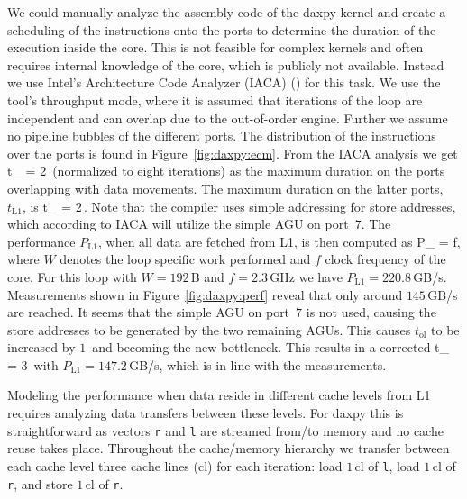 We could manually analyze the assembly code of the daxpy kernel and create a
scheduling of the instructions onto the ports to determine the duration of the
execution inside the core.
This is not feasible for complex kernels and often requires internal knowledge
of the core, which is publicly not available.
Instead we use Intel's Architecture Code Analyzer (IACA) (\cite{intel-iaca})
for this task. 
We use the tool's throughput mode, where it is assumed that iterations of the
loop are independent and can overlap due to the out-of-order engine.
Further we assume no pipeline bubbles of the different ports. 
The distribution of the instructions over the ports is found in
Figure~\ref{fig:daxpy:ecm}.
%
From the IACA analysis we get 
\be
  t_ = 2\,\cyw
\ee
%
(normalized to eight iterations) as the maximum duration on the ports overlapping with data
movements.
The maximum duration on the latter ports, $t_\text{L1}$, is
\be
  t_ = 2\,\cyw.
\ee
%
Note that the compiler uses simple addressing for store addresses, which
according to IACA will utilize the simple AGU on port~$7$.
%
%
The performance $P_\text{L1}$, when all data are fetched from L1, is then
computed as 
%
\be
  P_ =  f,
\ee
%
where $W$ denotes the loop specific work performed and $f$ clock
frequency of the core.
For this loop with $W=192$\,B and $f=2.3$\,GHz we have $P_\text{L1} =
220.8$\,GB/s. 
Measurements shown in Figure~\ref{fig:daxpy:perf} reveal that only around
$145$\,GB/s are reached.
It seems that the simple AGU on port~$7$ is not used, causing the store addresses to
be generated by the two remaining AGUs.
This causes $t_\text{ol}$ to be increased by $1$\,\cyw{} and becoming the new
bottleneck.
This results in a corrected
%
\be
   t_ = 3\,\cyw
\ee
%
with $P_\text{L1} = 147.2$\,GB/s, which is in line with the measurements.


Modeling the performance when data reside in different cache levels from L1
requires analyzing data transfers between these levels.
For daxpy this is straightforward as vectors \verb'r' and \verb'l' are
streamed from/to memory and no cache reuse takes place.
Throughout the cache/memory hierarchy we transfer between each cache level three 
cache lines (cl) for each iteration: load $1$\,cl of \verb'l', load $1$\,cl of
\verb'r', and store $1$\,cl of \verb'r'.

